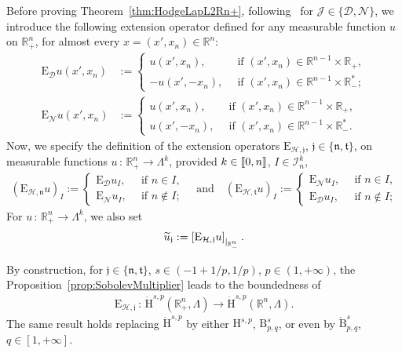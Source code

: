 \documentclass[10pt]{amsart}
\theoremstyle{definition}\newtheorem{defi}[theo]{Definition}\newtheorem{rema}[theo]{Remark}\newtheorem{exam}[theo]{Example}\newtheorem{exem}[theo]{Example}\newtheorem{nota}[theo]{Notation}
\newcommand{\bbR}{\mathbb{R}}
\newcommand{\rmH}{\mathrm{H}}%
\newcommand{\rmB}{\mathrm{B}}
\newcommand{\rmE}{\mathrm{E}}
\newcommand{\clH}{\mathcal{H}}
\newcommand{\clI}{\mathcal{I}}
\newcommand{\clN}{\mathcal{N}}
\newcommand{\clJ}{\mathcal{J}}
\newcommand{\clD}{\mathcal{D}}
\newcommand{\fkn}{\mathfrak{n}}
\newcommand{\fkt}{\mathfrak{t}}
\newcommand{\fkj}{\mathfrak{j}}
\newcommand{\llbracket}{\mathopen{[\mkern -2.7mu[}}
\newcommand{\rrbracket}{\mathclose{]\mkern -2.7mu]}}
\newcommand{\llb}{\llbracket}
\newcommand{\rrb}{\rrbracket}
\let\oldtilde\tilde
\renewcommand*{\tilde}[1]{\mathchoice{\widetilde{#1}}{\widetilde{#1}}{\oldtilde{#1}}{\oldtilde{#1}}}
\begin{document}
Before proving Theorem~\ref{thm:HodgeLapL2Rn+}, following~\cite[Section~5]{Gaudin2022} for $\clJ\in\{\clD,\clN\}$, we introduce the following extension operator defined for any measurable function $u$ on $\bbR^n_+$, for almost every $x=(x',x_n)\in\bbR^{n}$:
\begin{align*}
\rmE _\clD u (x',x_n) &:=
\begin{cases}
u(x',x_n),\,& \text{ if } (x',x_n)\in\bbR^{n-1}\times\bbR_+,\\
-u(x',-x_n),\,&\text{ if } (x',x_n)\in\bbR^{n-1}\times\bbR_-^*;
\end{cases}\\
\rmE _\clN u (x',x_n) &:=
\begin{cases}
u(x',x_n),\,&\text{ if } (x',x_n)\in\bbR^{n-1}\times\bbR_+,\\
u(x',-x_n),\,& \text{ if } (x',x_n)\in\bbR^{n-1}\times\bbR_-^* .
\end{cases}
\end{align*}
Now, we specify the definition of the extension operators $\rmE _{\clH,\fkj}$, $\fkj\in\{\fkn,\fkt\}$, on measurable functions $u\,:\,\bbR^n_+\longrightarrow \Lambda^k$, provided $k\in\llb 0,n\rrb$, $I\in\clI^{k}_{n}$,
\begin{align}\label{eq:HodgeReflexExtOp}
\left(\rmE _{\clH,\fkn}u\right)_{I}:=
\begin{cases}
\rmE _{\clD}u_{I}, \,&\text{ if } n\in I,\\
\rmE _{\clN}u_{I},\,&\text{ if } n\notin I;
\end{cases}\quad \text{and}\quad \left(\rmE _{\clH,\fkt}u\right)_{I}:=
\begin{cases}
\rmE _{\clN}u_{I},\,&\text{ if } n\in I,\\
\rmE _{\clD}u_{I},\,&\text{ if } n\notin I;
\end{cases}
\end{align}
For $u\,:\,\bbR^n_+\longrightarrow \Lambda^k$, we also set
\begin{align*}
\tilde{u}_{\fkj}:= \left[\rmE _{\clH,\fkj} u\right]_{|_{\bbR^n_{-}}}.
\end{align*}

By construction, for $\fkj\in\{\fkn,\fkt\}$, $s\in (-1+1/p,1/p)$, $p\in(1,+\infty)$, the Proposition~\ref{prop:SobolevMultiplier} leads to the boundedness of
\begin{align}\label{eq:HodgeExtOp}
\rmE _{\clH,\fkj}\,:\, \dot{\rmH}^{s,p}\left(\bbR^n_+,\Lambda\right)\longrightarrow \dot{\rmH}^{s,p}(\bbR^n,\Lambda) .
\end{align}
The same result holds replacing $\dot{\rmH}^{s,p}$ by either ${\rmH}^{s,p}$, ${\rmB}^{s}_{p,q}$, or even by $\dot{\rmB}^{s}_{p,q}$, $q\in[1,+\infty]$.
\end{document}
